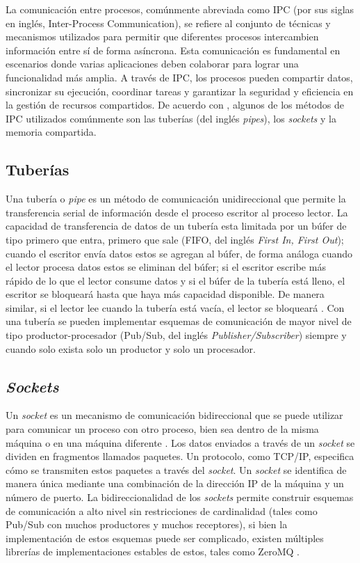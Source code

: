 La comunicación entre procesos, comúnmente abreviada como IPC (por sus siglas en inglés, Inter-Process Communication), se refiere al conjunto de técnicas y mecanismos utilizados para permitir que diferentes procesos intercambien información entre sí de forma asíncrona. Esta comunicación es fundamental en escenarios donde varias aplicaciones deben colaborar para lograr una funcionalidad más amplia. A través de IPC, los procesos pueden compartir datos, sincronizar su ejecución, coordinar tareas y garantizar la seguridad y eficiencia en la gestión de recursos compartidos. De acuerdo con \cite{IPCEval2015}, algunos de los métodos de IPC utilizados comúnmente son las tuberías (del inglés \textit{pipes}), los \textit{sockets} y la memoria compartida.

\subsection{Tuberías}

Una tubería o \textit{pipe} es un método de comunicación unidireccional que permite la transferencia serial de información desde el proceso escritor al proceso lector. La capacidad de transferencia de datos de un tubería esta limitada por un búfer de tipo primero que entra, primero que sale (FIFO, del inglés \textit{First In, First Out}); cuando el escritor envía datos estos se agregan al búfer, de forma análoga cuando el lector procesa datos estos se eliminan del búfer; si el escritor escribe más rápido de lo que el lector consume datos y si el búfer de la tubería está lleno, el escritor se bloqueará hasta que haya más capacidad disponible. De manera similar, si el lector lee cuando la tubería está vacía, el lector se bloqueará \cite{IPCEval2015}. Con una tubería se pueden implementar esquemas de comunicación de mayor nivel de tipo productor-procesador (Pub/Sub, del inglés \textit{Publisher/Subscriber}) siempre y cuando solo exista solo un productor y solo un procesador.

\subsection{\textit{Sockets}}

Un \textit{socket} es un mecanismo de comunicación bidireccional que se puede utilizar para comunicar un proceso con otro proceso, bien sea dentro de la misma máquina o en una máquina diferente \cite{IPCEval2015}. Los datos enviados a través de un \textit{socket} se dividen en fragmentos llamados paquetes. Un protocolo, como TCP/IP, especifica cómo se transmiten estos paquetes a través del \textit{socket}. Un \textit{socket} se identifica de manera única mediante una combinación de la dirección IP de la máquina y un número de puerto. La bidireccionalidad de los \textit{sockets} permite construir esquemas de comunicación a alto nivel sin restricciones de cardinalidad (tales como Pub/Sub con muchos productores y muchos receptores), si bien la implementación de estos esquemas puede ser complicado,  existen múltiples librerías de implementaciones estables de estos, tales como ZeroMQ \cite{zeroMQ}.

